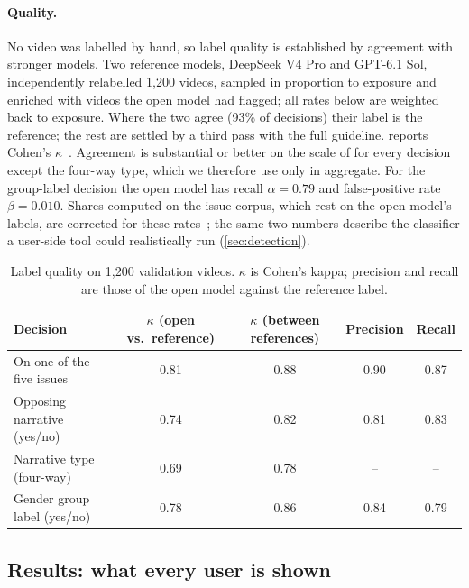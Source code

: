 \paragraph{Quality.} No video was labelled by hand, so label quality is established by agreement with stronger models. Two reference models, DeepSeek V4 Pro and GPT-6.1 Sol, independently relabelled 1{,}200 videos, sampled in proportion to exposure and enriched with videos the open model had flagged; all rates below are weighted back to exposure. Where the two agree (93\% of decisions) their label is the reference; the rest are settled by a third pass with the full guideline.  reports Cohen's $\kappa$~\citep{cohen1960kappa}. Agreement is substantial or better on the scale of \citet{landis1977agreement} for every decision except the four-way type, which we therefore use only in aggregate. For the group-label decision the open model has recall $\alpha=0.79$ and false-positive rate $\beta=0.010$. Shares computed on the issue corpus, which rest on the open model's labels, are corrected for these rates~\citep{rogan1978prevalence}; the same two numbers describe the classifier a user-side tool could realistically run (\cref{sec:detection}).

\begin{table}[t]
\caption{Label quality on 1{,}200 validation videos. $\kappa$ is Cohen's kappa; precision and recall are those of the open model against the reference label.}
\label{tab:quality}
\centering\small
\begin{tabular}{@{}lcccc@{}}
\toprule
Decision & $\kappa$ (open vs.\ reference) & $\kappa$ (between references) & Precision & Recall\\
\midrule
On one of the five issues & 0.81 & 0.88 & 0.90 & 0.87\\
Opposing narrative (yes/no) & 0.74 & 0.82 & 0.81 & 0.83\\
Narrative type (four-way) & 0.69 & 0.78 & -- & --\\
Gender group label (yes/no) & 0.78 & 0.86 & 0.84 & 0.79\\
\bottomrule
\end{tabular}
\end{table}

\subsection{Results: what every user is shown}

